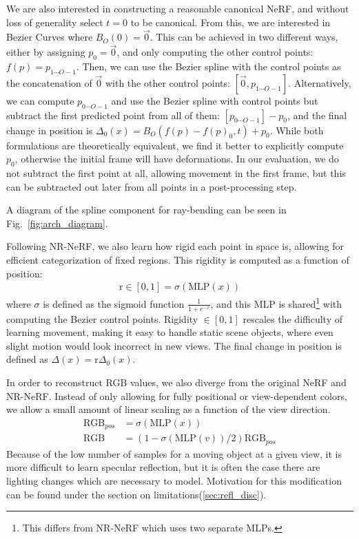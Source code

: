 We are also interested in constructing a reasonable canonical NeRF, and without loss of generality select $t = 0$ to be canonical. From this, we are interested in Bezier Curves where $B_O(0) = \overrightarrow{0}$. This can be achieved in two different ways, either by assigning $p_0 = \overrightarrow{0}$, and only computing the other control points: $f(p) = p_{1\cdots O-1}$. Then, we can use the Bezier spline with the control points as the concatenation of $\overrightarrow{0}$ with the other control points: $[\overrightarrow{0}, p_{1\cdots O-1}]$. Alternatively, we can compute $p_{0\cdots O-1}$ and use the Bezier spline with control points but subtract the first predicted point from all of them: $[p_{0\cdots O-1}]-p_0$, and the final change in position is $\Delta_0(x) = B_O(f(p)-f(p)_0,t)+p_0$. While both formulations are theoretically equivalent, we find it better to explicitly compute $p_0$, otherwise the initial frame will have deformations. In our evaluation, we do not subtract the first point at all, allowing movement in the first frame, but this can be subtracted out later from all points in a post-processing step.

\noindent
A diagram of the spline component for ray-bending can be seen in Fig.~\ref{fig:arch_diagram}.

Following NR-NeRF, we also learn how rigid each point in space is, allowing for efficient categorization of fixed regions. This rigidity is computed as a function of position:
\begin{align}
  \text{r}\in[0,1] =\sigma(\text{MLP}(x))\label{eq:rigidity_defn}
\end{align}
where $\sigma$ is defined as the sigmoid function $\frac{1}{1+e^{-x}}$, and this MLP is shared\footnote{This differs from NR-NeRF which uses two separate MLPs.} with computing the Bezier control points. Rigidity $\in[0,1]$ rescales the
difficulty of learning movement, making it easy to handle static scene
objects, where even slight motion would look incorrect in new views. The final change in position is defined as $\Delta(x) = \text{r}
\Delta_0(x)$.

In order to reconstruct RGB values, we also diverge from the original NeRF and NR-NeRF. Instead of only allowing for fully positional or view-dependent colors, we allow a small amount of linear scaling as a function of the view direction.
\begin{align}
  \text{RGB}_{pos} &= \sigma(\text{MLP}(x)) \nonumber \\
  \text{RGB} &= (1-\sigma(\text{MLP}(v))/2)\text{RGB}_{pos} \label{eq:refl_defn}
\end{align}
Because of the low number of
samples for a moving object at a given view, it is more difficult to learn specular
reflection, but it is often the case there are lighting changes which are necessary to model. Motivation for this modification can be found under the section on limitations(\ref{sec:refl_disc}).


